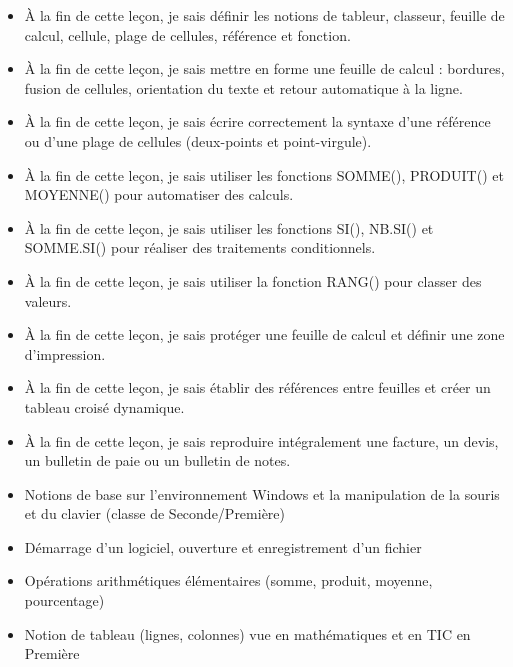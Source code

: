 \documentclass[11pt]{article}
\begin{document}
\begin{objectifs}
\begin{itemize}
\item À la fin de cette leçon, je sais définir les notions de tableur, classeur, feuille de calcul, cellule, plage de cellules, référence et fonction.
\item À la fin de cette leçon, je sais mettre en forme une feuille de calcul : bordures, fusion de cellules, orientation du texte et retour automatique à la ligne.
\item À la fin de cette leçon, je sais écrire correctement la syntaxe d'une référence ou d'une plage de cellules (deux-points et point-virgule).
\item À la fin de cette leçon, je sais utiliser les fonctions SOMME(), PRODUIT() et MOYENNE() pour automatiser des calculs.
\item À la fin de cette leçon, je sais utiliser les fonctions SI(), NB.SI() et SOMME.SI() pour réaliser des traitements conditionnels.
\item À la fin de cette leçon, je sais utiliser la fonction RANG() pour classer des valeurs.
\item À la fin de cette leçon, je sais protéger une feuille de calcul et définir une zone d'impression.
\item À la fin de cette leçon, je sais établir des références entre feuilles et créer un tableau croisé dynamique.
\item À la fin de cette leçon, je sais reproduire intégralement une facture, un devis, un bulletin de paie ou un bulletin de notes.
\end{itemize}
\end{objectifs}

\begin{prerequis}
\begin{itemize}
\item Notions de base sur l'environnement Windows et la manipulation de la souris et du clavier (classe de Seconde/Première)
\item Démarrage d'un logiciel, ouverture et enregistrement d'un fichier
\item Opérations arithmétiques élémentaires (somme, produit, moyenne, pourcentage)
\item Notion de tableau (lignes, colonnes) vue en mathématiques et en TIC en Première
\end{itemize}
\end{prerequis}

\newpage
\end{document}
